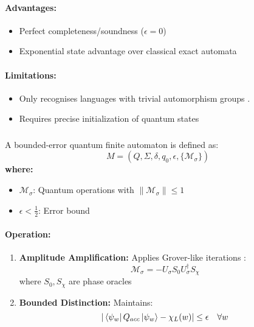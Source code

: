 \paragraph{Advantages:}
\begin{itemize}
    \item Perfect completeness/soundness ($\epsilon = 0$)
    \item Exponential state advantage over classical exact automata
\end{itemize}

\paragraph{Limitations:}
\begin{itemize}
    \item Only recognises languages with trivial automorphism groups \cite{brodsky2001}.
    \item Requires precise initialization of quantum states
\end{itemize}

\subsubsection{}
\label{subsec:beqfa}

\begin{definition}
A bounded-error quantum finite automaton is defined as:
\[
M = (Q, \Sigma, \delta, q_0, \epsilon, \{\mathcal{M}_\sigma\})
\]
\textbf{where:}
\begin{itemize}
    \item $\mathcal{M}_\sigma$: Quantum operations with $\|\mathcal{M}_\sigma\| \leq 1$
    \item $\epsilon < \frac{1}{2}$: Error bound
\end{itemize}
\end{definition}

\paragraph{Operation:}
\begin{enumerate}
    \item \textbf{Amplitude Amplification:} Applies Grover-like iterations \cite{grover1996fast, ambainis2002quantum}:
    \[
    \mathcal{M}_\sigma = -U_\sigma S_0 U_\sigma^\dagger S_\chi
    \]
    where $S_0, S_\chi$ are phase oracles
    \item \textbf{Bounded Distinction:} Maintains:
    \[
    |\bra{\psi_w}Q_{acc}\ket{\psi_w} - \chi_L(w)| \leq \epsilon \quad \forall w
    \]
\end{enumerate}


